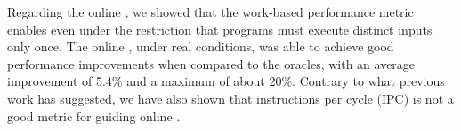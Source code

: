Regarding the online {\itercomp}, we showed that the work-based performance metric enables {\itercomp} even under the restriction that programs must execute distinct inputs only once.
The online {\itercomp}, under real conditions, was able to achieve good performance improvements when compared to the oracles, with an average improvement of 5.4\% and a maximum of about 20\%.
Contrary to what previous work has suggested, we have also shown that instructions per cycle (IPC) is not a good metric for guiding online {\itercomp}.
